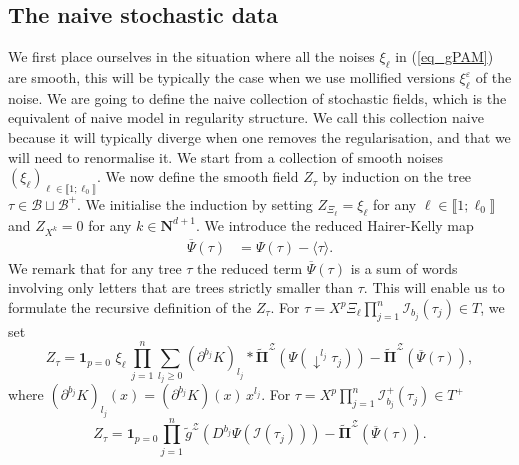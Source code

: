 \documentclass[11pt]{preprint}
\newcommand{\mcB}{\mathcal{B}}
\newcommand{\mcI}{\mathcal{I}}
\newcommand{\mcZ}{\mathcal{Z}}
\def\PPi{\boldsymbol{\Pi}}
\def\eps{\varepsilon}
\let\eps\varepsilon
\def\eqref#1{(\ref{#1})}
\renewcommand{\lg}{\langle}
\newcommand{\rg}{\rangle}
\newcommand{\bfN}{\mathbf{N}}
\newcommand{\bbrack}[1]{ \llbracket #1 \rrbracket }
\begin{document}
	\subsection{The naive stochastic data} \label{subsect_naivemodel}

We first place ourselves in the situation where all the noises $\xi_\ell$ in \eqref{eq_gPAM} are smooth, this will be typically the case when we use mollified versions $\xi^\eps_\ell$ of the noise. We are going to define the naive collection of stochastic fields, which is the equivalent of naive model in regularity structure. We call this collection naive because it will typically diverge when one removes the regularisation, and that we will need to renormalise it.
We start from a collection of smooth noises $(\xi_\ell)_{\ell\in\bbrack{1;\ell_0}}$. We now define the smooth field $Z_\tau$ by induction on the tree $\tau\in \mcB\sqcup\mcB^+$. We initialise the induction by setting   
$
Z_{\Xi_\ell} = \xi_\ell
$
for any $\ell\in\bbrack{1;\ell_0}$ and 
$
Z_{X^k}=0
$
for any $k\in\bfN^{d+1}$. We introduce the reduced Hairer-Kelly map
\begin{align*}
\overline\Psi(\tau)  &= \Psi(\tau) -  \lg  \tau \rg.
\end{align*}
We remark that for any tree $\tau$ the reduced term $\overline \Psi(\tau)$ is a sum of words involving only letters that are trees strictly smaller than $\tau$. This will enable us to formulate the recursive definition of the $Z_\tau$.
For $\tau = X^p\Xi_\ell\prod_{j=1}^n\mcI_{b_j}(\tau_j) \in T$, we set 
\begin{equation}\label{eq_defZtau_Naif}
	Z_\tau = \mathbf{1}_{p=0} \,\, \xi_\ell  \,  \prod_{j=1}^{n}\sum_{l_j\geq 0} (\partial^{b_j}K)_{l_j} * \widetilde{\PPi}^\mcZ \left(\Psi(\downarrow^{l_j}\tau_j)\right) - \widetilde{ \PPi}^\mcZ\left(\overline\Psi(\tau)\right),
\end{equation}
where $ (\partial^{b_j}K)_{l_j}(x) =(\partial^{b_j}K)(x) \, x^{l_j}$. For $\tau = X^p\prod_{j=1}^n\mcI^+_{b_j}(\tau_j) \in T^+$
\begin{equation}  \label{eq_defZtau_T+}
		Z_\tau = \mathbf{1}_{p=0} \prod_{j=1}^{n} \widetilde{ g}^\mcZ\left(D^{b_j}\Psi(\mcI(\tau_j))\right)  - \widetilde{ \PPi}^\mcZ\left(\overline\Psi(\tau)\right).
\end{equation}
\end{document}
